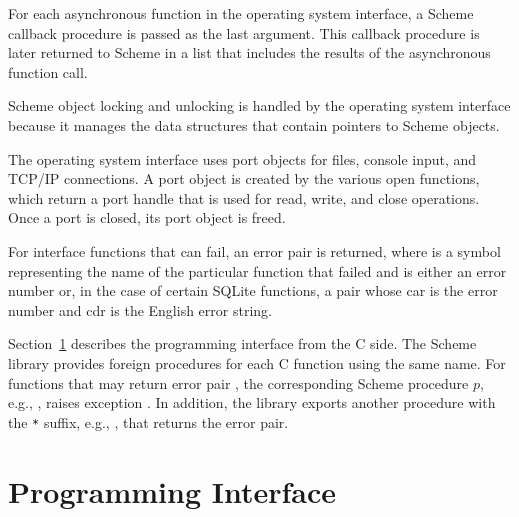 For each asynchronous function in the operating system interface, a
Scheme callback procedure is passed as the last argument.  This
callback procedure is later returned to Scheme in a list that includes
the results of the asynchronous function call.

Scheme object locking and unlocking is handled by the operating system
interface because it manages the data structures that contain pointers
to Scheme objects.

The operating system interface uses port objects for files, console
input, and TCP/IP connections. A port object is created by the various
open functions, which return a port handle that is used for read,
write, and close operations. Once a port is closed, its port object is
freed.

For interface functions that can fail, an error pair
 is returned, where  is a
symbol representing the name of the particular function that failed
and  is either an error number or, in the case of certain
SQLite functions, a pair whose car is the error number and cdr is the
English error string.

Section~\ref{sec:osi-api} describes the programming interface from the
C side. The Scheme library  provides foreign procedures
for each C function using the same name. For functions that may return
error pair , the corresponding Scheme
procedure $p$, e.g., , raises exception
. In addition, the
 library exports another procedure with the \verb|*|
suffix, e.g., , that returns the error pair.

\section {Programming Interface}\label{sec:osi-api}
